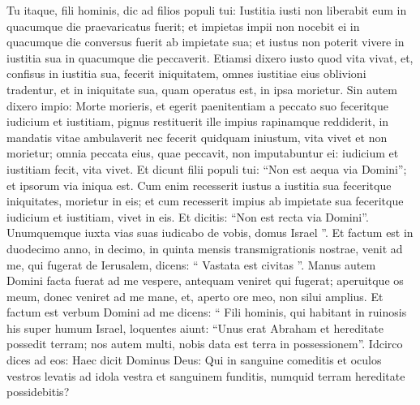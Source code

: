 \begin{biblechapter}
\begin{biblechapter}
\begin{biblechapter}
\begin{biblechapter}
\begin{biblechapter}
\begin{biblechapter}
\begin{biblechapter}
\begin{biblechapter}
\begin{biblechapter}
\begin{biblechapter}
\begin{biblechapter}
\begin{biblechapter}
\begin{biblechapter}
\begin{biblechapter}
\begin{biblechapter}
\begin{biblechapter}
\begin{biblechapter}
\begin{biblechapter}
\begin{biblechapter}
\begin{biblechapter}
\begin{biblechapter}
\begin{biblechapter}
\begin{biblechapter}
\begin{biblechapter}
\begin{biblechapter}
\begin{biblechapter}
\begin{biblechapter}
\begin{biblechapter}
\begin{biblechapter}
\begin{biblechapter}
\begin{biblechapter}
\begin{biblechapter}
\begin{biblechapter}
 \verse Tu itaque, fili hominis, dic ad filios populi tui: Iustitia iusti non liberabit eum in quacumque die praevaricatus fuerit; et impietas impii non nocebit ei in quacumque die conversus fuerit ab impietate sua; et iustus non poterit vivere in iustitia sua in quacumque die peccaverit. 
\verse Etiamsi dixero iusto quod vita vivat, et, confisus in iustitia sua, fecerit iniquitatem, omnes iustitiae eius oblivioni tradentur, et in iniquitate sua, quam operatus est, in ipsa morietur. 
\verse Sin autem dixero impio: Morte morieris, et egerit paenitentiam a peccato suo feceritque iudicium et iustitiam, 
\verse pignus restituerit ille impius rapinamque reddiderit, in mandatis vitae ambulaverit nec fecerit quidquam iniustum, vita vivet et non morietur; 
\verse omnia peccata eius, quae peccavit, non imputabuntur ei: iudicium et iustitiam fecit, vita vivet.
 \verse Et dicunt filii populi tui: “Non est aequa via Domini”; et ipsorum via iniqua est. 
\verse Cum enim recesserit iustus a iustitia sua feceritque iniquitates, morietur in eis; 
\verse et cum recesserit impius ab impietate sua feceritque iudicium et iustitiam, vivet in eis. 
\verse Et dicitis: “Non est recta via Domini”. Unumquemque iuxta vias suas iudicabo de vobis, domus Israel ”.
 \verse Et factum est in duodecimo anno, in decimo, in quinta mensis transmigrationis nostrae, venit ad me, qui fugerat de Ierusalem, dicens: “ Vastata est civitas ”. 
 \verse Manus autem Domini facta fuerat ad me vespere, antequam veniret qui fugerat; aperuitque os meum, donec veniret ad me mane, et, aperto ore meo, non silui amplius. 
\verse Et factum est verbum Domini ad me dicens: 
\verse “ Fili hominis, qui habitant in ruinosis his super humum Israel, loquentes aiunt: “Unus erat Abraham et hereditate possedit terram; nos autem multi, nobis data est terra in possessionem”. 
\verse Idcirco dices ad eos: Haec dicit Dominus Deus: Qui in sanguine comeditis et oculos vestros levatis ad idola vestra et sanguinem funditis, numquid terram hereditate possidebitis? 

\end{biblechapter}
\end{biblechapter}
\end{biblechapter}
\end{biblechapter}
\end{biblechapter}
\end{biblechapter}
\end{biblechapter}
\end{biblechapter}
\end{biblechapter}
\end{biblechapter}
\end{biblechapter}
\end{biblechapter}
\end{biblechapter}
\end{biblechapter}
\end{biblechapter}
\end{biblechapter}
\end{biblechapter}
\end{biblechapter}
\end{biblechapter}
\end{biblechapter}
\end{biblechapter}
\end{biblechapter}
\end{biblechapter}
\end{biblechapter}
\end{biblechapter}
\end{biblechapter}
\end{biblechapter}
\end{biblechapter}
\end{biblechapter}
\end{biblechapter}
\end{biblechapter}
\end{biblechapter}
\end{biblechapter}
